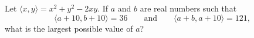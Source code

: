 Let $\langle x,y\rangle=x^2+y^2-2xy$. If $a$ and $b$ are real numbers such that
\[\langle a+10,b+10\rangle=36\qquad\text{and}\qquad\langle a+b,a+10\rangle=121,\]
what is the largest possible value of $a$?
